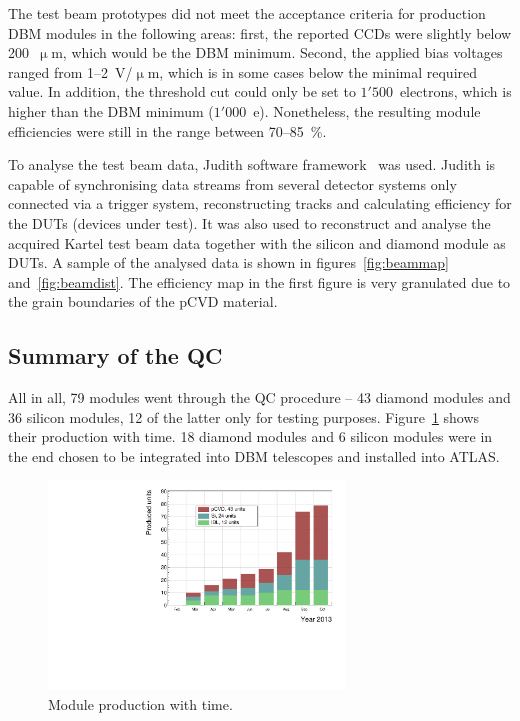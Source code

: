 The test beam prototypes did not meet the acceptance criteria for production DBM modules in the following areas: first, the reported CCDs were slightly below 200~$\upmu$m, which would be the DBM minimum. Second, the applied bias voltages ranged from 1--2~V/$\upmu$m, which is in some cases below the minimal required value. In addition, the threshold cut could only be set to $1'500$~electrons, which is higher than the DBM minimum ($1'000$~e). Nonetheless, the resulting module efficiencies were still in the range between 70--85~\%.

To analyse the test beam data, Judith software framework~\cite{McGoldrick:1982209} was used. Judith is capable of synchronising data streams from several detector systems only connected via a trigger system, reconstructing tracks and calculating efficiency for the DUTs (devices under test). It was also used to reconstruct and analyse the acquired Kartel test beam data together with the silicon and diamond module as DUTs. A sample of the analysed data is shown in figures~\ref{fig:beammap} and~\ref{fig:beamdist}. The efficiency map in the first figure is very granulated due to the grain boundaries of the pCVD material. 





\subsection{Summary of the QC}
All in all, 79 modules went through the QC procedure -- 43 diamond modules and 36 silicon modules, 12 of the latter only for testing purposes. Figure~\ref{fig:production} shows their production with time. 18 diamond modules and 6 silicon modules were in the end chosen to be integrated into DBM telescopes and installed into ATLAS.


\begin{figure}[!t]
\centering
\includegraphics[width=0.7\textwidth]{../scripts/04_charge_monitoring/plots/production1}
\caption{Module production with time.}
\label{fig:production}
\end{figure}



















